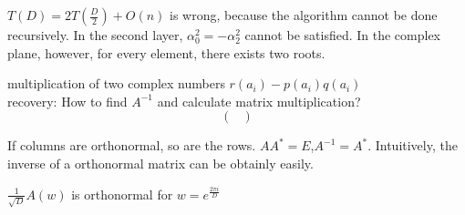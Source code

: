 $T(D)=2T(\frac{D}{2})+O(n)$ is wrong, because the algorithm cannot be done recursively. In the second layer, $\alpha_0^2=-\alpha_2^2$ cannot be satisfied.
In the complex plane, however, for every element, there exists two roots.

multiplication of two complex numbers $r(a_i)-p(a_i)q(a_i)$\\
recovery: 
How to find $A^{-1}$ and calculate matrix multiplication?
\[
    \left(
        \begin{matrix}
            
        \end{matrix}
        \right) 
\]

If columns are orthonormal, so are the rows.
$AA^{*}=E$,$A^{-1}=A^*$. Intuitively, the inverse of a orthonormal matrix can be obtainly easily.\\
\begin{prp}
    $\frac{1}{\sqrt{D}}A(w)$ is orthonormal for $w=e^{\frac{2\pi i}{D}}$
    
\end{prp}